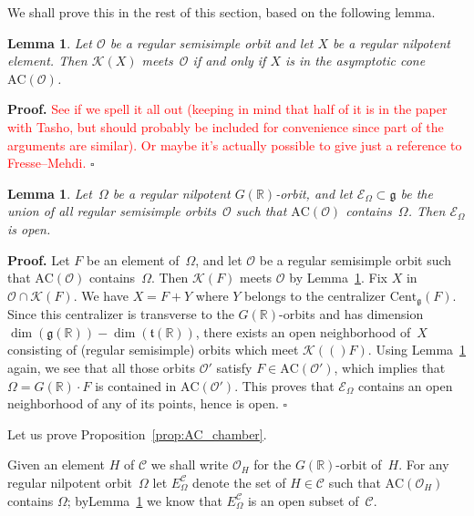 \documentclass[10pt,leqno]{article}
\newtheorem{lemma}[equation]{Lemma}
\newcommand{\qed}{\hfill $\square$ \medskip}
\newenvironment{proof}[1][Proof]{\noindent\textbf{#1.} }{\qed}
\newcommand{\R}{\mathbb R}
\renewcommand{\t}{\mathfrak t}
\newcommand{\g}{\mathfrak g}
\newcommand{\AC}{\mathrm{AC}}
\newcommand{\Kostant}[1]{\mathcal{K}(#1)}
\begin{document}
We shall prove this in the rest of this section, based on the following lemma.

\begin{lemma}\label{lem:Kost_and_AC} Let $\mathcal{O}$ be a regular semisimple orbit and  let $X$ be a regular nilpotent element. Then $\Kostant{X}$ meets~$\mathcal{O}$ if and only if $X$ is in the asymptotic cone~$\AC(\mathcal{O})$. 
\end{lemma}
\begin{proof} \textcolor{red}{See if we spell it all out (keeping in mind that half of it is in the paper with Tasho, but should probably be included for convenience since part of the arguments are similar). Or maybe it's actually possible to give just a reference to Fresse--Mehdi.} \end{proof}


\begin{lemma}\label{lem:AC_containment} Let~$\Omega$ be a regular nilpotent $G(\R)$-orbit, and let $\mathcal{E}_\Omega \subset \g$ be the union of all regular semisimple orbits~$\mathcal{O}$ such that $\AC(\mathcal{O})$ contains~$\Omega$. Then $\mathcal{E}_\Omega$ is open. 
\end{lemma}

\begin{proof}
Let $F$ be an element of~$\Omega$, and let $\mathcal{O}$  be a regular semisimple orbit such that $\AC(\mathcal{O})$ contains~$\Omega$.
Then $\Kostant{F}$ meets $\mathcal{O}$ by  Lemma~\ref{lem:Kost_and_AC}. 
Fix $X$ in $\mathcal{O} \cap \Kostant{F}$.
We have $X =F+Y$ where $Y$ belongs to the centralizer $\mathrm{Cent}_\g(F)$.
Since this centralizer is transverse to the $G(\R)$-orbits and has dimension $\dim(\g(\R))-\dim(\t(\R))$,
there exists an open neighborhood of~$X$ consisting of (regular semisimple) orbits  which meet $\Kostant(F)$.
Using Lemma~\ref{lem:Kost_and_AC} again, we see that all those orbits $\mathcal{O}'$ satisfy $F \in \AC(\mathcal{O}')$,
which implies that $\Omega = G(\R) \cdot F$ is contained in $\AC(\mathcal{O}')$.
This proves that $\mathcal{E}_\Omega$ contains an open neighborhood of any of its points, hence is open.   \end{proof}


Let us prove Proposition~\ref{prop:AC_chamber}. 

Given an element $H$ of $\mathcal{C}$ we shall write $\mathcal{O}_H$ for the $G(\R)$-orbit of~$H$. For any regular nilpotent orbit~$\Omega$ let $E^{\mathcal{C}}_\Omega$  denote the set of $H \in \mathcal{C}$ such that $\AC(\mathcal{O}_H)$ contains $\Omega$; byLemma~\ref{lem:AC_containment}  we know that   $E^{\mathcal{C}}_\Omega$ is an open subset of~$\mathcal{C}$. 
\end{document}
